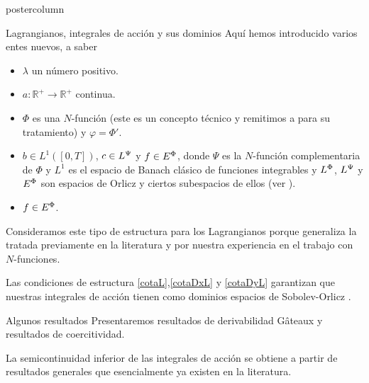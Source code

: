\documentclass[final,hyperref={pdfpagelabels=false}]{beamer}
\begin{document}
\begin{frame}
\begin{columns}
\begin{column}{.49\textwidth}
\begin{beamercolorbox}[center,wd=\textwidth]{postercolumn}
\begin{minipage}[T]{.95\textwidth}
{\begin{block}{Lagrangianos, integrales de acción y sus dominios}
Aquí hemos introducido varios entes nuevos, a saber

              \begin{itemize}
              \item $\lambda$ un número positivo.

              \item  $a:\mathbb{R}^+\to \mathbb{R}^+$ continua.

              \item  $\Phi$ es una $N$-función (este es un concepto  técnico y remitimos a \cite{KR} para su tratamiento) y $\varphi=\Phi'$.

              \item $b\in L^1([0,T])$, $c\in L^{\Psi}$ y $f\in E^{\Phi}$, donde $\Psi$ es la $N$-función complementaria de $\Phi$ y $L^1$ es el espacio de Banach clásico de funciones integrables y $L^{\Phi}$, $L^{\Psi}$ y $E^{\Phi}$ son espacios de Orlicz y ciertos subespacios de ellos (ver \cite{KR} ).

              \item $f\in E^{\Phi}$.

              \end{itemize}

Consideramos este tipo de estructura para los Lagrangianos porque generaliza  la tratada previamente en la literatura y por nuestra experiencia en el trabajo con $N$-funciones.

Las condiciones de estructura \eqref{cotaL},\eqref{cotaDxL} y \eqref{cotaDyL} garantizan que nuestras integrales de acción tienen como dominios espacios de Sobolev-Orlicz \cite{adams_sobolev, ABGMS2015}.
\end{block}

\begin{block}{Algunos resultados}
Presentaremos resultados de derivabilidad G\^ateaux y resultados de coercitividad. 

La semicontinuidad inferior de las integrales de acción se obtiene a partir de resultados generales que esencialmente ya existen en la literatura. 


\end{block}



            \vfill
}
\end{minipage}
\end{beamercolorbox}
\end{column}








\end{columns}
\end{frame}
\end{document}
